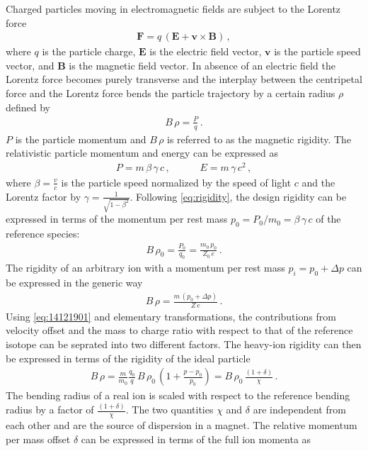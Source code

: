 Charged particles moving in electromagnetic fields are subject to the Lorentz force~\cite{griffiths13}
\begin{align}
\mathbf{F} = q \, ( \mathbf{E} + \mathbf{v} \times \mathbf{B} ) \, ,
\end{align} 
where $q$ is the particle charge, $\mathbf{E}$ is the electric field vector, $\mathbf{v}$ is the particle speed vector, and $\mathbf{B}$ is the magnetic field vector. In absence of an electric field the Lorentz force becomes purely transverse and the interplay between the centripetal force and the Lorentz force bends the particle trajectory by a certain radius $\rho$ defined by~\cite{wiedemann1999particle}
\begin{align}
B \, \rho = \frac{P}{q} \, . \label{eq:rigidity}
\end{align}  
$P$ is the particle momentum and $B \, \rho$ is referred to as the magnetic rigidity. The relativistic particle momentum and energy can be expressed as
\begin{align}
P = m \, \beta \, \gamma \, c \, , \quad \quad \quad E = m \, \gamma \, c^2 \, ,
\end{align}
where $\beta=\frac{v}{c}$ is the particle speed normalized by the speed of light $c$ and the Lorentz factor by $\gamma = \frac{1}{\sqrt{1-\beta^2}}$. Following \eqref{eq:rigidity}, the design rigidity can be expressed  in terms of the momentum per rest mass $p_0=P_0/m_0 = \beta \, \gamma \, c$ of the reference species:
\begin{align}
B \, \rho_0 = \frac{P_0}{q_0} = \frac{m_0 \, p_0}{Z_0 \, e} \, . \label{eq:14121901}
\end{align}
 The rigidity of an arbitrary ion with a momentum per rest mass $p_i = p_0 + \Delta p$ can be expressed in the generic way
\begin{align}
B\,\rho = \frac{m \, (p_0 + \Delta p)}{Z \, e} \, .
\end{align} 
Using \eqref{eq:14121901} and elementary transformations, the contributions from velocity offset and the mass to charge ratio with respect to that of the reference isotope can be seprated into two different factors. The heavy-ion rigidity can then be expressed in terms of the rigidity of the ideal particle
\begin{align}
B \, \rho = \frac{m}{m_0} \frac{q_0}{q} \, B \, \rho_0 \, \left( 1 + \frac{p - p_0}{p_0} \right) =  B \, \rho_0 \, \frac{\left( 1 + \delta \right)}{\chi}  \, . \label{eq:15080401}
\end{align}
The bending radius of a real ion is scaled with respect to the reference bending radius by a factor of $\frac{(1+\delta)}{\chi}$. The two quantities $\chi$ and $\delta$ are independent from each other and are the source of dispersion in a magnet. The relative momentum per mass offset $\delta$ can be expressed in terms of the full ion momenta as
